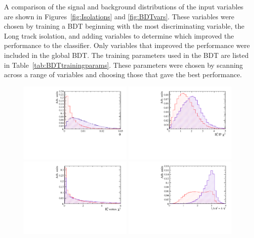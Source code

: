 A comparison of the signal and background distributions of the input variables are shown in Figures~\ref{fig:Isolations} and \ref{fig:BDTvars}. These variables were chosen by training a BDT beginning with the most discriminating variable, the Long track isolation, and adding variables to determine which improved the performance to the classifier. Only variables that improved the performance were included in the global BDT. The training parameters used in the BDT are listed in Table~\ref{tab:BDTtrainingparams}. These parameters were chosen by scanning across a range of variables and choosing those that gave the best performance. 

\begin{figure}[htbp]
    \centering
        \includegraphics[width=0.49\textwidth]{./Figs/Selection/Arcos_Mar.pdf}
       \includegraphics[width=0.49\textwidth]{./Figs/Selection/B_IPS_Mar.pdf}
 \includegraphics[width=0.49\textwidth]{./Figs/Selection/Vertex_Mar.pdf}
 \includegraphics[width=0.49\textwidth]{./Figs/Selection/srqt_Mar.pdf}

\end{figure}
